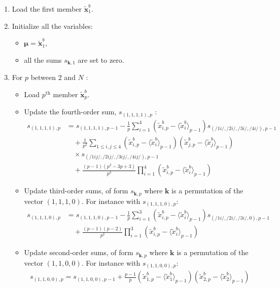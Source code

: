 \documentclass[12pt]{scrartcl}
\begin{document}
\begin{enumerate}
\item Load the first member $\widetilde{\mathbf{x}}^b_1$.
\item Initialize all the variables:
\begin{itemize}
\item $\boldsymbol{\mu} = \widetilde{\mathbf{x}}^b_1$,
\item all the sums $s_{\mathbf{k},1}$ are set to zero.
\end{itemize}
\item For $p$ between 2 and $N$ :
\begin{itemize}
\item Load $p^\text{th}$ member $\widetilde{\mathbf{x}}^b_p$.
\item Update the fourth-order sum, $s_{(1,1,1,1),p}$ :
\begin{align}
s_{(1,1,1,1),p} & = s_{(1,1,1,1),p-1} - \frac{1}{p} \sum_{i=1}^4 \left(\widetilde{x}^b_{i,p} - \langle \widetilde{x}^b_i \rangle_{p-1}\right) s_{(/1i/,/2i/,/3i/,/4i/),p-1} \nonumber \\
& \quad + \frac{1}{p^2} \sum_{1 \le i,j \le 4}  \left(\widetilde{x}^b_{i,p} - \langle \widetilde{x}^b_i \rangle_{p-1}\right) \left(\widetilde{x}^b_{j,p} - \langle \widetilde{x}^b_j \rangle_{p-1}\right) \nonumber \\
& \quad \times s_{(/1ij/,/2ij/,/3ij/,/4ij/),p-1} \nonumber \\
& \quad + \frac{(p-1)(p^2-3p+3)}{p^3} \prod_{i=1}^4 \left(\widetilde{x}^b_{i,p} - \langle \widetilde{x}^b_i \rangle_{p-1}\right)
\end{align}
\item Update third-order sums, of form $s_{\mathbf{k},p}$ where $\mathbf{k}$ is a permutation of the vector $(1,1,1,0)$. For instance with $s_{(1,1,1,0),p}$:
\begin{align}
s_{(1,1,1,0),p} & = s_{(1,1,1,0),p-1} - \frac{1}{p} \sum_{i=1}^3 \left(\widetilde{x}^b_{i,p} - \langle \widetilde{x}^b_i \rangle_{p-1}\right) s_{(/1i/,/2i/,/3i/,0),p-1}  \nonumber \\
& \quad + \frac{(p-1)(p-2)}{p^2} \prod_{i=1}^3 \left(\widetilde{x}^b_{i,p} - \langle \widetilde{x}^b_i \rangle_{p-1}\right)
\end{align}
\item Update second-order sums, of form $s_{\mathbf{k},p}$ where $\mathbf{k}$ is a permutation of the vector $(1,1,0,0)$. For instance with $s_{(1,1,0,0),p}$:
\begin{align}
s_{(1,1,0,0),p} = s_{(1,1,0,0),p-1} + \frac{p-1}{p} \left(\widetilde{x}^b_{1,p} - \langle \widetilde{x}^b_1 \rangle_{p-1}\right) \left(\widetilde{x}^b_{2,p} - \langle \widetilde{x}^b_2 \rangle_{p-1}\right)

\end{align}
\end{itemize}
\end{enumerate}
\end{document}
